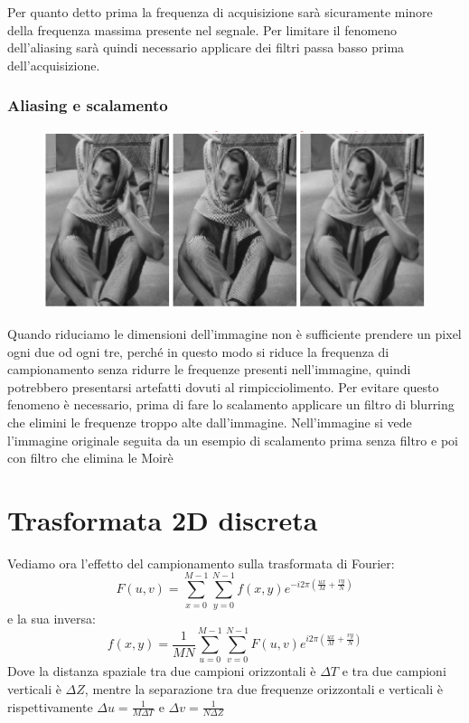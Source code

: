 Per quanto detto prima la frequenza di acquisizione sarà sicuramente minore della frequenza massima presente nel segnale. Per limitare il fenomeno dell'aliasing sarà quindi necessario applicare dei filtri passa basso prima dell'acquisizione.
\subsubsection{Aliasing e scalamento}
\begin{figure}
	\vspace{-.5cm}
	\centering
	\includegraphics[width=\linewidth]{Picture/Aliasing_Scaling}
\end{figure}
Quando riduciamo le dimensioni dell'immagine non è sufficiente prendere un pixel ogni due od ogni tre, perché in questo modo si riduce la frequenza di campionamento senza ridurre le frequenze presenti nell'immagine, quindi potrebbero presentarsi artefatti dovuti al rimpicciolimento. Per evitare questo fenomeno è necessario, prima di fare lo scalamento applicare un filtro di blurring che elimini le frequenze troppo alte dall'immagine. Nell'immagine si vede l'immagine originale seguita da un esempio di scalamento prima senza filtro e poi con filtro che elimina le Moirè

\section{Trasformata 2D discreta}
Vediamo ora l'effetto del campionamento sulla trasformata di Fourier:
\begin{equation}
	F(u,v) = \sum_{x=0}^{M-1}\sum_{y=0}^{N-1}f(x,y) e^{-i2\pi (\frac{ux}{M} + \frac{vy}{N})}
\end{equation}
e la sua inversa: 
\begin{equation}
	f(x,y) = \frac{1}{MN}\sum_{u=0}^{M-1}\sum_{v=0}^{N-1}F(u,v) e^{i2\pi (\frac{ux}{M} + \frac{vy}{N})}
\end{equation}
Dove la distanza spaziale tra due campioni orizzontali è $\Delta T$ e tra due campioni verticali è $\Delta Z$, mentre la separazione tra due frequenze orizzontali e verticali è rispettivamente $\Delta u = \frac{1}{M \Delta T}$ e $\Delta v = \frac{1}{N \Delta Z}$

